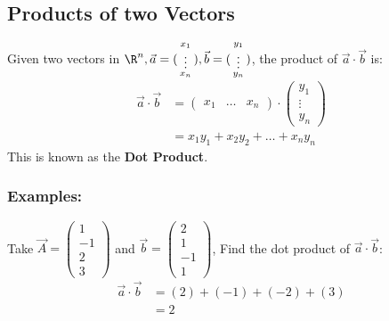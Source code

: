 \documentclass[a4paper]{article}
\begin{document}
  \subsection{Products of two Vectors}
  \begin{theorem}
    Given two vectors in $\R^n ,\vec{a} = (\begin{smallmatrix}x_1 \\ \vdots \\ x_n\end{smallmatrix}), \vec{b} = (\begin{smallmatrix}y_1\\ \vdots \\ y_n\end{smallmatrix})$, the product of $\vec{a} \cdot \vec{b}$ is:
    \begin{displaymath}
      \begin{split}
        \vec{a} \cdot \vec{b} &= \begin{pmatrix}
          x_1 & \dots & x_n 
        \end{pmatrix} \cdot \begin{pmatrix}
          y_1 \\ \vdots \\ y_n
      \end{pmatrix}\\
                              &= x_1y_1 + x_2y_2 + \dots + x_ny_n
      \end{split}
    \end{displaymath}
   This is known as the \textbf{Dot Product}.
  \end{theorem}
  \subsubsection{Examples:}
  Take $\vec{A} = (\begin{smallmatrix} 1 \\ -1 \\ 2 \\ 3\end{smallmatrix})$ and $\vec{b} = (\begin{smallmatrix}2 \\ 1 \\ -1 \\ 1\end{smallmatrix})$, Find the dot product of $\vec{a} \cdot \vec{b}$:
  \begin{equation}
    \label{eq:2}
    \begin{split}
      \vec{a} \cdot \vec{b} &= (2) + (-1) + (-2) + (3) \\
                            &= 2
    \end{split}
  \end{equation}
\end{document}
